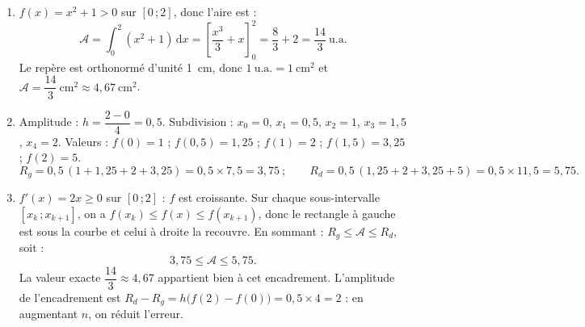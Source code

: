 \documentclass[11pt]{article}
\begin{document}
\begin{corrige}
\begin{enumerate}
\item $f(x)=x^2+1 > 0$ sur $[0\,;2]$, donc l'aire est :
\[
\mathcal{A} = \int_0^2 (x^2+1)\,\mathrm{d}x = \left[\dfrac{x^3}{3}+x\right]_0^2 = \dfrac{8}{3}+2 = \dfrac{14}{3}\ \text{u.a.}
\]
Le repère est orthonormé d'unité \SI{1}{cm}, donc $1\ \text{u.a.} = 1\ \mathrm{cm}^2$ et $\mathcal{A} = \boxed{\dfrac{14}{3}\ \mathrm{cm}^2 \approx 4{,}67\ \mathrm{cm}^2}$.
\item Amplitude : $h = \dfrac{2-0}{4} = 0{,}5$. Subdivision : $x_0=0$, $x_1=0{,}5$, $x_2=1$, $x_3=1{,}5$, $x_4=2$.
Valeurs : $f(0)=1$ ; $f(0{,}5)=1{,}25$ ; $f(1)=2$ ; $f(1{,}5)=3{,}25$ ; $f(2)=5$.
\[
R_g = 0{,}5\,(1+1{,}25+2+3{,}25) = 0{,}5\times 7{,}5 = \boxed{3{,}75} \ ;\qquad
R_d = 0{,}5\,(1{,}25+2+3{,}25+5) = 0{,}5\times 11{,}5 = \boxed{5{,}75}.
\]
\item $f'(x)=2x \ge 0$ sur $[0\,;2]$ : $f$ est croissante. Sur chaque sous-intervalle $[x_k\,;x_{k+1}]$, on a $f(x_k)\le f(x)\le f(x_{k+1})$, donc le rectangle à gauche est sous la courbe et celui à droite la recouvre. En sommant : $R_g \le \mathcal{A} \le R_d$, soit :
\[
\boxed{3{,}75 \le \mathcal{A} \le 5{,}75}.
\]
La valeur exacte $\dfrac{14}{3}\approx 4{,}67$ appartient bien à cet encadrement. L'amplitude de l'encadrement est $R_d - R_g = h\big(f(2)-f(0)\big) = 0{,}5\times 4 = 2$ : en augmentant $n$, on réduit l'erreur.
\end{enumerate}
\end{corrige}
\end{document}

